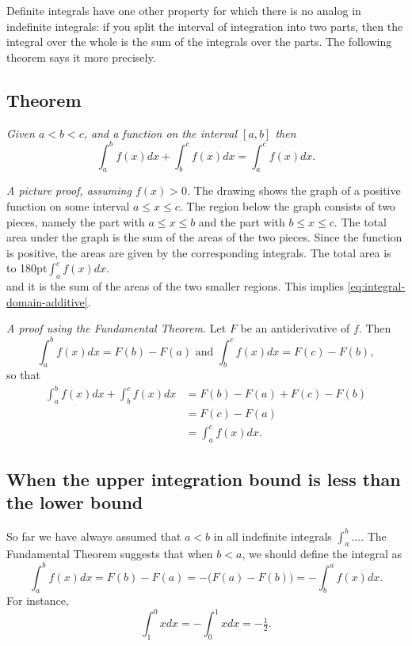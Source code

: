 Definite integrals have one other property for which there is no
analog in indefinite integrals: if you split the interval of
integration into two parts, then the integral over the whole is the
sum of the integrals over the parts. The following theorem says it
more precisely.

\subsection{Theorem}
\itshape
Given $a<b<c$, and a function on the interval $[a,b]$ then
\begin{equation}
  \label{eq:integral-domain-additive}
  \int_a^b f(x)dx + \int_b^c f(x)dx = \int_a^c f(x)dx .
\end{equation}\upshape%


%
\textit{A picture proof, assuming $f(x)>0$. } The drawing shows the
graph of a positive function on some interval $a\leq x\leq c$.  The
region below the graph consists of two pieces, namely the part with
$a\leq x\leq b$ and the part with $b\leq x\leq c$.  The total area
under the graph is the sum of the areas of the two pieces.  Since the
function is positive, the areas are given by the corresponding
integrals.  The total area is\\
\hbox to 180pt{\hspace{60pt}$\displaystyle \int_a^c f(x)dx$.}\\
and it is the sum of the areas of the two smaller regions.  This
implies \eqref{eq:integral-domain-additive}.

\noindent%
\parbox[b][0pt][b]{0.4\textwidth}{ }

\textit{A proof using the Fundamental Theorem. } Let $F$ be an
antiderivative of $f$.  Then
\[
\int_a^b f(x)dx = F(b) - F(a) \text{ and } \int_b^c f(x)dx = F(c) -
F(b),
\]
so that
\begin{align*}
   \int_a^b f(x)dx + \int_b^c f(x)dx   &= F(b) - F(a) + F(c) - F(b) \\
  &= F(c) - F(a) \\
  &=\int_a^c f(x)dx.
\end{align*}

\subsection{When the upper integration bound is less than the lower bound}
So far we have always assumed that $a<b$ in all indefinite integrals
$\int_a^b \ldots$.  The Fundamental Theorem suggests that when $b<a$,
we should define the integral as
\begin{equation}
  \int_a^bf(x)dx = F(b)-F(a) = -\bigl(F(a)-F(b)\bigr) = -\int_b^a f(x)dx.
\end{equation}
For instance,
\[
\int_1^0 xdx = -\int_0^1 xdx = -\tfrac12.
\]




